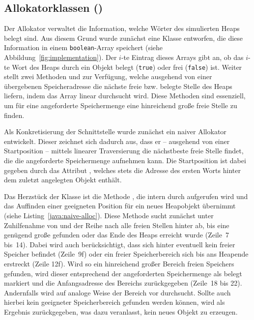 \subsection{Allokatorklassen ()}
\label{sub:allocator}
Der Allokator verwaltet die Information, welche Wörter des simulierten Heaps belegt sind.
Aus diesem Grund wurde zunächst eine Klasse  entworfen, die diese Information in einem \texttt{boolean}-Array speichert (siehe Abbildung~\ref{fig:implementation}).
Der $i$-te Eintrag dieses Arrays gibt an, ob das $i$-te Wort des Heaps durch ein Objekt belegt (\texttt{true}) oder frei (\texttt{false}) ist.
Weiter stellt  zwei Methoden  und  zur Verfügung, welche ausgehend von einer übergebenen Speicheradresse die nächste freie bzw. belegte Stelle des Heaps liefern, indem das Array linear durchsucht wird.
Diese Methoden sind essenziell, um für eine angeforderte Speichermenge eine hinreichend große freie Stelle zu finden.

Als Konkretisierung der Schnittstelle  wurde zunächst ein naiver Allokator entwickelt.
Dieser zeichnet sich dadurch aus, dass er -- ausgehend von einer Startposition -- mittels linearer Traversierung die nächstbeste freie Stelle findet, die die angeforderte Speichermenge aufnehmen kann.
Die Startposition ist dabei gegeben durch das Attribut , welches stets die Adresse des ersten Worts hinter dem zuletzt angelegten Objekt enthält.

Das Herzstück der Klasse  ist die Methode , die intern durch  aufgerufen wird und das Auffinden einer geeigneten Position für ein neues Heapobjekt übernimmt (siehe Listing~\ref{java:naive-alloc}).
Diese Methode sucht zunächst unter Zuhilfenahme von  und  der Reihe nach alle freien Stellen hinter  ab, bis eine genügend große gefunden oder das Ende des Heaps erreicht wurde (Zeile~7 bis~14).
Dabei wird auch berücksichtigt, dass sich hinter  eventuell kein freier Speicher befindet (Zeile~9f) oder ein freier Speicherbereich sich bis ans Heapende erstreckt (Zeile 12f).
Wird so ein hinreichend großer Bereich freien Speichers gefunden, wird dieser entsprechend der angeforderten Speichermenge als belegt markiert und die Anfangsadresse des Bereichs zurückgegeben (Zeile~18 bis 22).
Andernfalls wird auf analoge Weise der Bereich vor  durchsucht.
Sollte auch hierbei kein geeigneter Speicherbereich gefunden werden können, wird als Ergebnis  zurückgegeben, was  dazu veranlasst, kein neues Objekt zu erzeugen.

